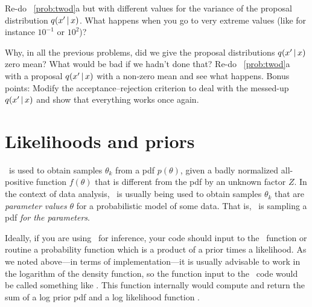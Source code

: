 \documentclass[modern]{aastex61}
\newcommand{\MCMC}{\acronym{MCMC}}
\newcommand{\pars}{\theta}
\begin{document}
\begin{problem}\label{prob:MH-sigma}
Re-do \problemname~\ref{prob:twod}a but with different values for
the variance of the proposal distribution $q(x'\,|\, x)$.
What happens when you go to very extreme values (like for instance
$10^{-1}$ or $10^2$)?
\end{problem}

\begin{problem}\label{prob:prop-mean}
Why, in all the previous problems, did we give the proposal
distributions $q(x'\,|\, x)$ zero mean?
What would be bad if we hadn't done that?
Re-do \problemname~\ref{prob:twod}a with a proposal $q(x'\,|\, x)$ with a
non-zero mean and see what happens.
Bonus points: Modify the acceptance--rejection criterion to deal with
the messed-up $q(x'\,|\, x)$ and show that everything works once
again.
\end{problem}

\section{Likelihoods and priors}\label{sec:likelihood}

\MCMC\ is used to obtain samples $\pars_k$ from a pdf $p(\pars)$,
  given a badly normalized all-positive function $f(\pars)$
  that is different from the pdf by an unknown factor $Z$.
In the context of data analysis,
  \MCMC\ is usually being used to obtain samples $\pars_k$
  that are \emph{parameter values} $\pars$ for a probabilistic model of some data.
That is, \MCMC\ is sampling a pdf \emph{for the parameters}.

Ideally, if you are using \MCMC\ for inference, your code should input
to the \MCMC\ function or routine a probability function which is a
product of a prior times a likelihood.
As we noted above---in terms of implementation---it is usually advisable to work in the
logarithm of the density function, so the function input to the \MCMC\ code
would be called something like .
This function  internally would compute and return the
sum of a log prior pdf  and a log likelihood function
.
\end{document}
